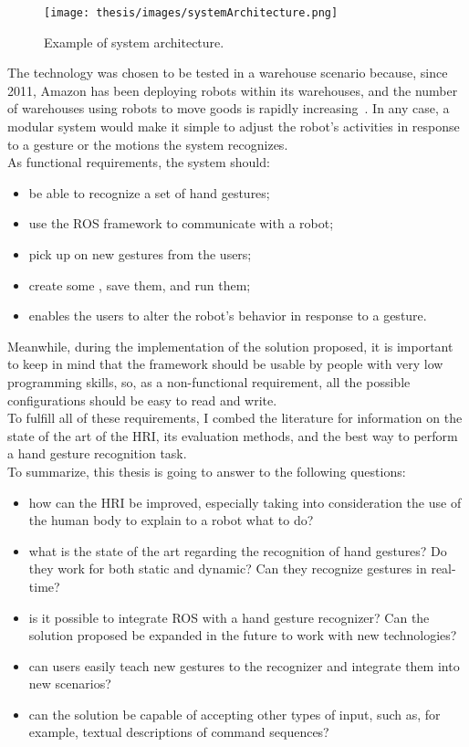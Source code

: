 \documentclass[../thesis.tex]{subfiles}
\begin{document}
\begin{figure}
  \centering
  \texttt{[image: thesis/images/systemArchitecture.png]}
  \caption{Example of system architecture.}
  \label{fig:systemArchitecture}
\end{figure}

The technology was chosen to be tested in a warehouse scenario because, since 2011, Amazon has been deploying robots within its warehouses, and the number of warehouses using robots to move goods is rapidly increasing~\cite{paper:bogue2016}. In any case, a modular system would make it simple to adjust the robot's activities in response to a gesture or the motions the system recognizes.\\

As functional requirements, the system should:
\begin{itemize}
    \item be able to recognize a set of hand gestures;
    \item use the \gls{ROS} framework to communicate with a robot;
    \item pick up on new gestures from the users;
    \item create some , save them, and run them;
    \item enables the users to alter the robot's behavior in response to a gesture.
\end{itemize}
Meanwhile, during the implementation of the solution proposed, it is important to keep in mind that the framework should be usable by people with very low programming skills, so, as a non-functional requirement, all the possible configurations should be easy to read and write.\\

To fulfill all of these requirements, I combed the literature for information on the state of the art of the \acrshort{HRI}, its evaluation methods, and the best way to perform a hand gesture recognition task.\\

To summarize, this thesis is going to answer to the following questions:
\begin{itemize}
    \item how can the \acrlong{HRI} be improved, especially taking into consideration the use of the human body to explain to a robot what to do?
    \item what is the state of the art regarding the recognition of hand gestures? Do they work for both static and dynamic? Can they recognize gestures in real-time?
    \item is it possible to integrate \gls{ROS} with a hand gesture recognizer? Can the solution proposed be expanded in the future to work with new technologies?
    \item can users easily teach new gestures to the recognizer and integrate them into new scenarios?
    \item can the solution be capable of accepting other types of input, such as, for example, textual descriptions of command sequences?
\end{itemize}
\end{document}
